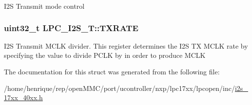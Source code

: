 I2\-S Transmit mode control \hypertarget{structLPC__I2S__T_ab62a8a48830412bcf4cec1b1ed5a5b21}{
\subsubsection[{T\-X\-R\-A\-T\-E}]{ uint32\-\_\-t L\-P\-C\-\_\-\-I2\-S\-\_\-\-T\-::\-T\-X\-R\-A\-T\-E}}\label{structLPC__I2S__T_ab62a8a48830412bcf4cec1b1ed5a5b21}
I2\-S Transmit M\-C\-L\-K divider. This register determines the I2\-S T\-X M\-C\-L\-K rate by specifying the value to divide P\-C\-L\-K by in order to produce M\-C\-L\-K 

The documentation for this struct was generated from the following file\-:\begin{DoxyCompactItemize}
\item 
/home/henrique/rep/open\-M\-M\-C/port/ucontroller/nxp/lpc17xx/lpcopen/inc/\hyperlink{i2s__17xx__40xx_8h}{i2s\-\_\-17xx\-\_\-40xx.\-h}\end{DoxyCompactItemize}
